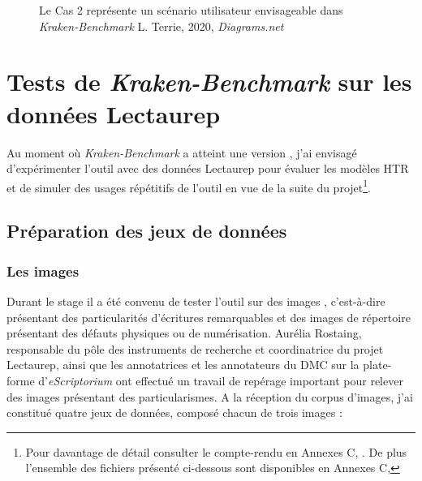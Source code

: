\begin{figure}[H]
    \centering
    \centerline{}
    \caption{Le Cas 2 représente un scénario utilisateur envisageable dans \textit{Kraken-Benchmark} \textcopyright L. Terrie, 2020, \textit{Diagrams.net}}
    \label{fig:TEI-KB}
\end{figure}

\newpage
\thispagestyle{empty}
\chapter{Tests de \textit{Kraken-Benchmark} sur les données Lectaurep}\label{tests_KB_lectaurep}

Au moment où \textit{Kraken-Benchmark} a atteint une version , j'ai envisagé d'expérimenter l'outil avec des données Lectaurep pour évaluer les modèles HTR et de simuler des usages répétitifs de l'outil en vue de la suite du projet\footnote{Pour davantage de détail consulter le compte-rendu en Annexes C, . De plus l'ensemble des fichiers présenté ci-dessous sont disponibles en Annexes C, }.

\section{Préparation des jeux de données} 

\subsection{Les images} 
Durant le stage il a été convenu de tester l'outil sur des images , c'est-à-dire présentant des particularités d'écritures remarquables et des images de répertoire présentant des défauts physiques ou de numérisation. Aurélia Rostaing, responsable du pôle des instruments de recherche et coordinatrice du projet Lectaurep, ainsi que les annotatrices et les annotateurs du DMC sur la plate-forme d'\textit{eScriptorium} ont effectué un travail de repérage important pour relever des images présentant des particularismes. A la réception du corpus d'images, j'ai constitué quatre jeux de données, composé chacun de trois images :

